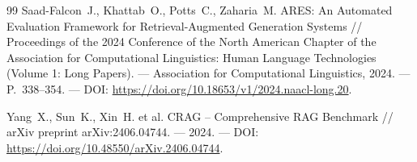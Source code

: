 \documentclass{misisarticle}
\begin{document}
\begin{thebibliography}{99}
 Saad-Falcon~J., Khattab~O., Potts~C., Zaharia~M. ARES: An Automated Evaluation Framework for Retrieval-Augmented Generation Systems // Proceedings of the 2024 Conference of the North American Chapter of the Association for Computational Linguistics: Human Language Technologies (Volume 1: Long Papers). — Association for Computational Linguistics, 2024. — P.~338–354. — DOI: \url{https://doi.org/10.18653/v1/2024.naacl-long.20}.

 Yang~X., Sun~K., Xin~H. et al. CRAG -- Comprehensive RAG Benchmark // arXiv preprint arXiv:2406.04744. — 2024. — DOI: \url{https://doi.org/10.48550/arXiv.2406.04744}.

\end{thebibliography}
\end{document}
